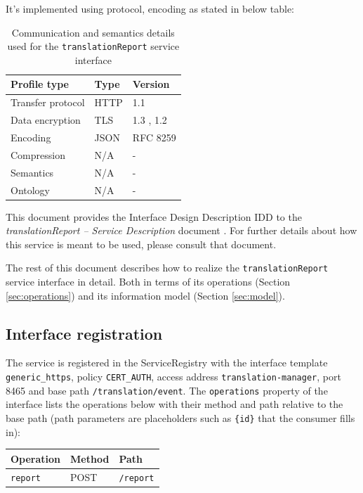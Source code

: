 \documentclass[a4paper]{arrowhead}
\begin{document}
It's implemented using protocol, encoding as stated in below table:
\begin{table}[ht!]
  \centering
  \begin{tabular}{|l|l|l|}
    \hline
    \rowcolor{gray!33} Profile type & Type & Version \\ \hline
    Transfer protocol & HTTP & 1.1 \cite{rfc9112} \\ \hline
    Data encryption & TLS & 1.3 \cite{rfc8446}, 1.2 \cite{rfc5246} \\ \hline
    Encoding & JSON & RFC 8259 \cite{rfc8259} \\ \hline
    Compression & N/A & - \\ \hline
    Semantics & N/A & - \\ \hline
    Ontology & N/A & - \\ \hline
  \end{tabular}
  \caption{Communication and semantics details used for the \texttt{translationReport} service interface}
  \label{tab:comunication_semantics_profile}
\end{table}

This document provides the Interface Design Description IDD to the \textit{translationReport -- Service Description} document \cite{tm-translationReport-sd}.
For further details about how this service is meant to be used, please consult that document.

The rest of this document describes how to realize the \texttt{translationReport} service
interface in detail. Both in terms of its operations (Section \ref{sec:operations}) and its information model (Section \ref{sec:model}).

\subsection{Interface registration}

The service is registered in the ServiceRegistry with the interface template \texttt{generic\_\allowbreak{}https}, policy \texttt{CERT\_\allowbreak{}AUTH}, access address \texttt{translation-\allowbreak{}manager}, port 8465 and base path \texttt{/\allowbreak{}translation/\allowbreak{}event}. The \texttt{operations} property of the interface lists the operations below with their method and path relative to the base path (path parameters are placeholders such as \texttt{\{id\}} that the consumer fills in):

\noindent\begin{longtable}{| p{5.2cm} | p{1.6cm} | p{8.4cm} |} \hline
\rowcolor{gray!33} Operation & Method & Path \\ \hline \endhead
\texttt{report} & POST & \texttt{/\allowbreak{}report} \\ \hline
\end{longtable}
\end{document}
